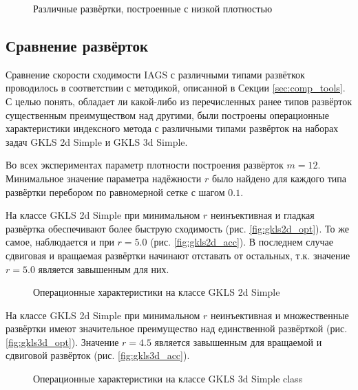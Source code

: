 \begin{figure}[ht]
    \centering
    \caption{Различные развёртки, построенные с низкой плотностью}
\end{figure}

\subsection{Сравнение развёрток}
\label{sec:seq_comp}
Сравнение скорости сходимости IAGS с различными типами развёткок проводилось в соответствии с методикой, описанной в
Секции \ref{sec:comp_tools}. С целью понять, обладает ли какой-либо из перечисленных ранее типов развёрток существенным преимуществом над другими,
были построены операционные характеристики индексного метода с различными типами развёрток на наборах задач GKLS 2d Simple и GKLS 3d Simple.

Во всех экспериментах параметр плотности построения развёрток $m=12$. Минимальное значение параметра надёжности \(r\) было найдено
для каждого типа развёртки перебором по равномерной сетке с шагом \(0.1\).

На классе GKLS 2d Simple при минимальном \(r\) неинъективная и гладкая развёртка обеспечивают более быструю сходимость
(рис. \ref{fig:gkls2d_opt}). То же самое, наблюдается и при \(r=5.0\) (рис. \ref{fig:gkls2d_acc}). В последнем случае сдвиговая и
вращаемая развёртки начинают отставать от остальных, т.к. значение \(r=5.0\) является завышенным для них.
\begin{figure}[ht]
    \centering
    \caption{Операционные характеристики на классе GKLS 2d Simple}
\end{figure}

На классе GKLS 2d Simple при минимальном \(r\) неинъективная и множественные развёртки имеют значительное
преимущество над единственной развёрткой (рис. \ref{fig:gkls3d_opt}). Значение \(r=4.5\) является завышенным для
вращаемой и сдвиговой развёрток (рис. \ref{fig:gkls3d_acc}).

\begin{figure}[ht]
    \centering
    \caption{Операционные характеристики на классе GKLS 3d Simple class}
\end{figure}

